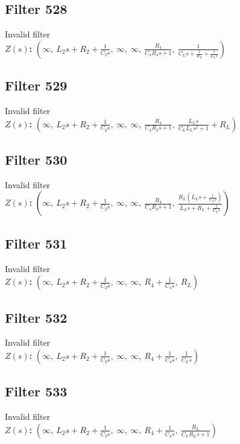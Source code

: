\documentclass{article}
\begin{document}
\subsection*{Filter 528}
Invalid filter \\ 
\textbf{$Z(s)$:} $\left( \infty, \  L_{2} s + R_{2} + \frac{1}{C_{2} s}, \  \infty, \  \infty, \  \frac{R_{4}}{C_{4} R_{4} s + 1}, \  \frac{1}{C_{L} s + \frac{1}{R_{L}} + \frac{1}{L_{L} s}}\right)$ \\ 
\subsection*{Filter 529}
Invalid filter \\ 
\textbf{$Z(s)$:} $\left( \infty, \  L_{2} s + R_{2} + \frac{1}{C_{2} s}, \  \infty, \  \infty, \  \frac{R_{4}}{C_{4} R_{4} s + 1}, \  \frac{L_{L} s}{C_{L} L_{L} s^{2} + 1} + R_{L}\right)$ \\ 
\subsection*{Filter 530}
Invalid filter \\ 
\textbf{$Z(s)$:} $\left( \infty, \  L_{2} s + R_{2} + \frac{1}{C_{2} s}, \  \infty, \  \infty, \  \frac{R_{4}}{C_{4} R_{4} s + 1}, \  \frac{R_{L} \left(L_{L} s + \frac{1}{C_{L} s}\right)}{L_{L} s + R_{L} + \frac{1}{C_{L} s}}\right)$ \\ 
\subsection*{Filter 531}
Invalid filter \\ 
\textbf{$Z(s)$:} $\left( \infty, \  L_{2} s + R_{2} + \frac{1}{C_{2} s}, \  \infty, \  \infty, \  R_{4} + \frac{1}{C_{4} s}, \  R_{L}\right)$ \\ 
\subsection*{Filter 532}
Invalid filter \\ 
\textbf{$Z(s)$:} $\left( \infty, \  L_{2} s + R_{2} + \frac{1}{C_{2} s}, \  \infty, \  \infty, \  R_{4} + \frac{1}{C_{4} s}, \  \frac{1}{C_{L} s}\right)$ \\ 
\subsection*{Filter 533}
Invalid filter \\ 
\textbf{$Z(s)$:} $\left( \infty, \  L_{2} s + R_{2} + \frac{1}{C_{2} s}, \  \infty, \  \infty, \  R_{4} + \frac{1}{C_{4} s}, \  \frac{R_{L}}{C_{L} R_{L} s + 1}\right)$ \\ 
\end{document}
